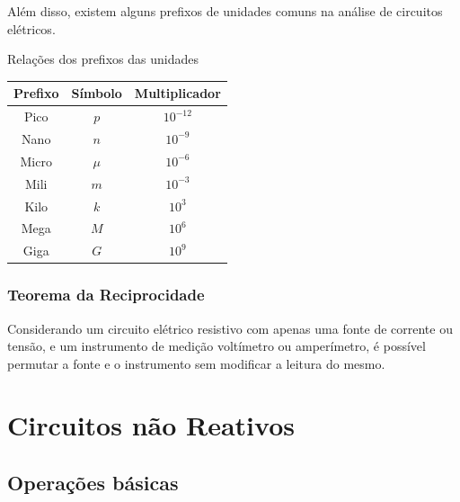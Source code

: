\documentclass{article}
\numberwithin{equation}{section}
\begin{document}
    Além disso, existem alguns prefixos de unidades comuns na análise de circuitos elétricos.

    \begin{center}
        Relações dos prefixos das unidades \\
        \begin{tabular}{|c|c|c|} \hline
            Prefixo & Símbolo & Multiplicador \\ \hline
            Pico & $p$ & $10^{-12}$ \\
            Nano & $n$ & $10^{-9}$ \\
            Micro & $\mu$ & $10^{-6}$ \\
            Mili & $m$ & $10^{-3}$ \\
            Kilo & $k$ & $10^{3}$ \\
            Mega & $M$ & $10^{6}$ \\
            Giga & $G$ & $10^{9}$ \\ \hline
        \end{tabular}
    \end{center}

    \subsubsection{Teorema da Reciprocidade}
    Considerando um circuito elétrico resistivo com apenas uma fonte de corrente ou tensão, e um instrumento de medição voltímetro ou amperímetro, é possível permutar a fonte e o instrumento sem modificar a leitura do mesmo.


    \newpage

    \section{Circuitos não Reativos}
    \label{sec:resistivos}

    \subsection{Operações básicas}
\end{document}

